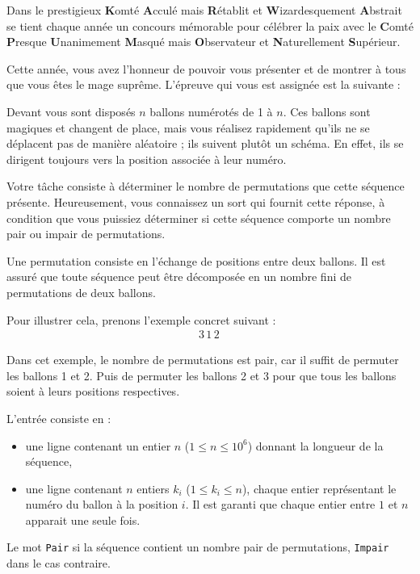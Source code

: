 \problemname{\problemyamlname}


Dans le prestigieux \textbf{K}omté \textbf{A}cculé mais \textbf{R}établit et \textbf{W}izardesquement \textbf{A}bstrait se tient chaque année un concours mémorable pour célébrer la paix avec le \textbf{C}omté \textbf{P}resque \textbf{U}nanimement \textbf{M}asqué mais \textbf{O}bservateur et \textbf{N}aturellement \textbf{S}upérieur.

Cette année, vous avez l'honneur de pouvoir vous présenter et de montrer à tous que vous êtes le mage suprême. L'épreuve qui vous est assignée est la suivante :

Devant vous sont disposés $n$ ballons numérotés de 1 à $n$. Ces ballons sont magiques et changent de place, mais vous réalisez rapidement qu'ils ne se déplacent pas de manière aléatoire ; ils suivent plutôt un schéma. En effet, ils se dirigent toujours vers la position associée à leur numéro.

Votre tâche consiste à déterminer le nombre de permutations que cette séquence présente. Heureusement, vous connaissez un sort qui fournit cette réponse, à condition que vous puissiez déterminer si cette séquence comporte un nombre pair ou impair de permutations.

Une permutation consiste en l'échange de positions entre deux ballons. Il est assuré que toute séquence peut être décomposée en un nombre fini de permutations de deux ballons.

Pour illustrer cela, prenons l'exemple concret suivant :
\begin{align*}
    3\, 1\, 2\,
\end{align*}

Dans cet exemple, le nombre de permutations est pair, car il suffit de permuter les ballons 1 et 2. Puis de permuter les ballons 2 et 3 pour que tous les ballons soient à leurs positions respectives.

\begin{Input}
    L'entrée consiste en :
    \begin{itemize}
        \item une ligne contenant un entier $n$ ($1 \le n \le 10^6$) donnant la longueur de la séquence,
        \item une ligne contenant $n$ entiers $k_i $ ($1 \le k_i \le n$), chaque entier représentant le numéro du ballon à la position $i$. Il est garanti que chaque entier entre $1$ et $n$ apparait une seule fois.
    \end{itemize}
\end{Input}

\begin{Output}
    Le mot \texttt{Pair} si la séquence contient un nombre pair de permutations, \texttt{Impair} dans le cas contraire.
\end{Output}
